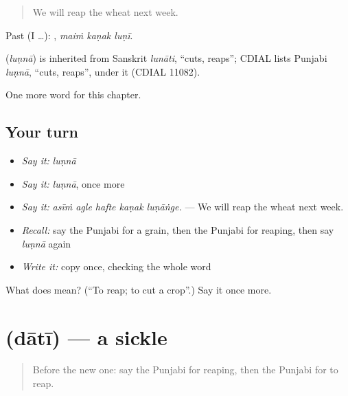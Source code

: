 \begin{quote}
We will reap the wheat next week.
\end{quote}

Past (I …):   , \emph{maiṁ kaṇak luṇī}.

\begin{cousinweb}
\textbf{} (\emph{luṇnā}) is inherited from Sanskrit \emph{lunāti}, \textquotedblleft{}cuts, reaps\textquotedblright{}; CDIAL lists Punjabi \emph{luṇnā}, \textquotedblleft{}cuts, reaps\textquotedblright{}, under it (CDIAL 11082).
\end{cousinweb}

\begin{grammarlens}[title={What you've built}]
One more word for this chapter.
\end{grammarlens}

\subsection*{Your turn}
\begin{itemize}
\raggedright
  \item \emph{Say it:} \emph{luṇnā}
  \item \emph{Say it:} \emph{luṇnā}, once more
  \item \emph{Say it:} \emph{asīṁ agle hafte kaṇak luṇāṅge.} — We will reap the wheat next week.
  \item \emph{Recall:} say the Punjabi for a grain, then the Punjabi for reaping, then say \emph{luṇnā} again
  \item \emph{Write it:} copy \textbf{} once, checking the whole word
\end{itemize}

\begin{tcolorbox}[breakable,colback=teal!4,colframe=teal!35!black,title={Before you move on}]
What does  mean? (\textquotedblleft{}To reap; to cut a crop\textquotedblright{}.) Say it once more.
\end{tcolorbox}
\section[\texorpdfstring{\pa{ਦਾਤੀ} (dātī)}{ਦਾਤੀ (dātī)}]{ (dātī) — a sickle}

\label{lesson:PA-C305-dati}



\begin{quote}
Before the new one: say the Punjabi for reaping, then the Punjabi for to reap.
\end{quote}


